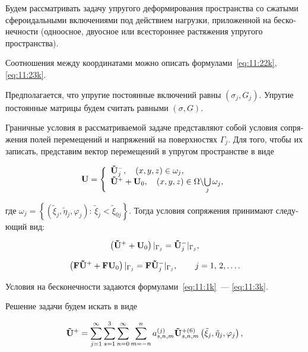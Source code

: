\begin{russian}
Будем рассматривать задачу упругого деформирования пространства со сжатыми сфероидальными включениями под действием нагрузки, приложенной на бесконечности (одноосное, двуосное или всестороннее растяжения упругого пространства).

Соотношения между координатами можно описать формулами~\eqref{eq:11:22k}, \eqref{eq:11:23k}.

Предполагается, что упругие постоянные включений равны $(\sigma_j,G_j)$. Упругие постоянные матрицы будем считать равными $(\sigma,G)$.

Граничные условия в рассматриваемой задаче представляют собой условия сопряжения полей перемещений и напряжений на поверхностях $\Gamma_j$. Для того, чтобы их записать, представим вектор перемещений в упругом пространстве в виде

\begin{equation}
{\bf{U}} = \left\{ {\begin{array}{*{20}{l}}
{{\bf{\tilde U}}_j^ - ,\quad \left( {x,y,z} \right) \in \omega_j,}\\
{{{{\bf{\tilde U}}}^ + } + {{\bf{U}}_0},\quad \left( {x,y,z} \right) \in\Omega\backslash {\bigcup\limits_j\omega_j},}
\end{array}} \right.
\label{eq:11:23l}
\end{equation}

\noindent где $\omega_j = \left\{ {\left( {{\tilde\xi_j},{\tilde\eta _j},{\varphi _j}} \right):\, {\tilde\xi_j} < {\tilde\xi_{0j}}} \right\}$. Тогда условия сопряжения принимают следующий вид:

\begin{equation}
\left( {{{{\bf{\tilde U}}}^ + } + {{\bf{U}}_0}} \right){|_{{\Gamma _j}}} = {\bf{\tilde U}}_j^ - {|_{{\Gamma _j}}},
\label{eq:11:24l}
\end{equation}

\begin{equation}
\left( {{\bf{F\tilde U^+}} + {\bf{F}}{{\bf{U}}_0}} \right){|_{{\Gamma _j}}} = {\bf{F}}{{\bf{\tilde U^-}}_j}{|_{{\Gamma _j}}},\qquad {\kern 1pt} j = 1,{\mkern 1mu} {\kern 1pt} 2,\dots.
\label{eq:11:25l}
\end{equation}

\noindent Условия на бесконечности задаются формулами~\eqref{eq:11:1k}~--- \eqref{eq:11:3k}.

Решение задачи будем искать в виде

\begin{equation}
{\bf{\tilde U^+}} = \sum\limits_{j = 1}^\infty {\sum\limits_{s = 1}^3 {\sum\limits_{n = 0}^\infty  {\sum\limits_{m=-n}^{n} {a_{s,n,m}^{(j)}} } } } {\bf{\tilde U}}_{s,n,m}^{ + (6)}\left( {{\tilde\xi_j},{\tilde\eta _j},{\varphi _j}} \right),
\label{eq:11:26l}
\end{equation}


\end{russian}
